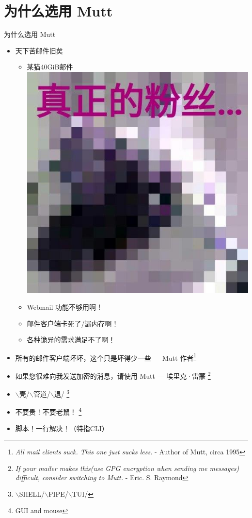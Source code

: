 \documentclass{ctexbeamer}
\begin{document}
\section{为什么选用 Mutt}
\begin{frame}{为什么选用 Mutt}
  \begin{itemize}
    \item 天下苦邮件旧矣\begin{itemize}
        \item 某猫40GiB邮件\qquad\includegraphics[height=3\fontcharht\font`\B]{felix.jpg}
        \item Webmail 功能不够用啊！
        \item 邮件客户端卡死了/漏内存啊！
        \item 各种诡异的需求满足不了啊！
      \end{itemize}
    \item 所有的邮件客户端坏坏，这个只是坏得少一些 --- Mutt 作者\footnote{
        \textit{All mail clients suck. This one just sucks less.} - Author of Mutt, circa 1995}
    \item 如果您很难向我发送加密的消息，请使用 Mutt --- 埃里克·雷蒙
      \footnote{\textit{If your mailer makes this(use GPG encryption when sending me messages) difficult, consider switching to Mutt.} - Eric. S. Raymond}
    \item $\backslash$壳/$\backslash$管道/$\backslash$退/
      \footnote{$\backslash$SHELL/$\backslash$PIPE/$\backslash$TUI/}
    \item 不要贵！不要老鼠！
      \footnote{GUI and mouse}
    \item 脚本！一行解决！（特指CLI）
  \end{itemize}
\end{frame}
\end{document}
